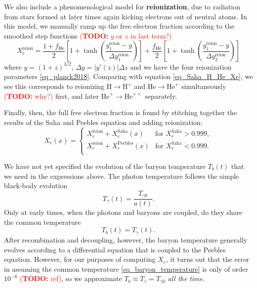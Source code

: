\documentclass[10pt,a4paper]{article}
\newcommand\TODO[1]{\textcolor{red}{(\textbf{TODO:} #1)}}
\begin{document}
We also include a phenomenological model for \textbf{reionization}, due to radiation from stars formed at later times again kicking electrons out of neutral atoms.
In this model, we manually ramp up the free electron fraction according to the smoothed step functions
\TODO{$y$ or $z$ in last term?}
\begin{equation}
	X_e^\text{reion} = \frac{1+f_\text{He}}{2} \left[ 1 + \tanh \left( \frac{y^\text{reion}_1-y}{\Delta y^\text{reion}_1} \right) \right]
                     + \frac{f_\text{He}}{2} \left[ 1 + \tanh \left( \frac{y^\text{reion}_1-y}{\Delta y^\text{reion}_2} \right) \right]
\label{eq_reionization}
\end{equation}
where $y = (1+z)^{3/2}$, $\Delta y = |y'(z)| \Delta z$ and we have the four reionization parameters \ref{eq_planck2018}.
Comparing with equation \eqref{eq_Saha_H_He_Xe}, we see this corresponds to reionizing $\text{H} \rightarrow \text{H}^+$ and $\text{He} \rightarrow \text{He}^+$ simultaneously \TODO{why?} first,
and later $\text{He}^{+} \rightarrow \text{He}^{++}$ separately.

Finally, then, the full free electron fraction is found by stitching together the results of the Saha and Peebles equation and adding reionization:
\begin{equation}
	X_e(x) = \begin{cases}
	             X_e^\text{reion} + X_e^\text{Saha}(x) & \text{for $X_e^\text{Saha} > 0.999$}, \\
	             X_e^\text{reion} + X_e^\text{Peebles}(x) & \text{for $X_e^\text{Saha} < 0.999$}. \\
	         \end{cases}
\label{eq_free_electron_fraction}
\end{equation}

We have not yet specified the evolution of the baryon temperature $T_b(t)$ that we need in the expressions above.
The photon temperature follows the simple black-body evolution
\begin{equation}
	T_\gamma(t) = \frac{T_{\gamma 0}}{a(t)}.
\label{eq_photon_temperature}
\end{equation}
Only at early times, when the photons and baryons are coupled, do they share the common temperature
\begin{equation}
	T_b(t) = T_{\gamma}(t).
\label{eq_baryon_temperature}
\end{equation}
After recombination and decoupling, however,
the baryon temperature generally evolves according to a differential equation that is coupled to the Peebles equation.
However, for our purposes of computing $X_e$,
it turns out that the error in assuming the common temperature \eqref{eq_baryon_temperature} is only of order $10^{-6}$ \TODO{ref},
so we approximate $T_b \approx T_\gamma = T_{\gamma 0}$ \emph{all the time}.
\end{document}
